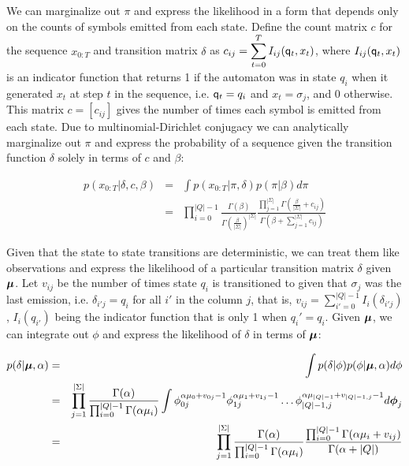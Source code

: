 We can marginalize out $\pi$ and express the likelihood in a form that depends only on the counts of symbols emitted from each state.  Define the count matrix $c$ for the sequence $x_{0:T}$ and transition matrix $\delta$ as $c_{ij} = \displaystyle\sum_{t=0}^T I_{ij}(\q_t,x_t)$, where $I_{ij}(\q_t,x_t)$ is an indicator function that returns 1 if the automaton was in state $q_i$ when it generated $x_t$ at step $t$ in the sequence, i.e. $\q_t = q_i$ and $x_t = \sigma_j$, and 0 otherwise. This matrix $c = [c_{ij}]$ gives the number of times each symbol is emitted from each state.  Due to multinomial-Dirichlet conjugacy we can analytically marginalize out $\pi$ and express the probability of a sequence given the transition function $\delta$ solely in terms of $c$ and $\beta$:

\begin{eqnarray}
 p(x_{0:T}|\delta,c,\beta) & = & \int p(x_{0:T}|\pi,\delta) p(\pi|\beta) d\pi \label{x:factor} \\
 & = & \prod_{i=0}^{|Q|-1} \frac{\Gamma(\beta)}{\Gamma(\frac{\beta}{|\Sigma|})^{|\Sigma|}} \frac{\prod_{j=1}^{|\Sigma|}\Gamma(\frac{\beta}{|\Sigma|} + c_{ij})}{\Gamma(\beta + \sum_{j=1}^{|\Sigma|} c_{ij})} \label{x:end}
 \end{eqnarray}
 
 
 
 Given that the state to state transitions are deterministic, we can treat them like observations and express the likelihood of a particular transition matrix $\delta$ given $\bmu$.  Let $v_{ij}$ be the number of times state $q_i$ is transitioned to given that $\sigma_j$ was the last emission, i.e. $\delta_{i'j} = q_i$ for all $i'$ in the column $j$, that is, $v_{ij} = \displaystyle\sum_{i' = 0}^{|Q|-1} I_{i}(\delta_{i'j})$, $I_i(q_{i'})$ being the indicator function that is only 1 when $q_i' = q_i$.  Given $\bmu$, we can integrate out $\phi$ and express the likelihood of $\delta$ in terms of $\bmu$:
 
 \begin{eqnarray}
 p(\delta|\bmu,\alpha) & = & \int p(\delta|\phi)p(\phi|\bmu,\alpha) d\phi \label{delta:factor}\\
  & = & \prod_{j=1}^{|\Sigma|} \frac{\Gamma(\alpha)}{\prod_{i=0}^{|Q|-1}\Gamma(\alpha\mu_i)} \int \phi_{0j}^{\alpha\mu_0+v_{0j}-1} \phi_{1j}^{\alpha\mu_1+v_{1j}-1} \ldots \phi_{|Q|-1,j}^{\alpha\mu_{|Q|-1}+v_{|Q|-1,j}-1} d\bphi_j \label{delta:int}\\
  & = &  \prod_{j=1}^{|\Sigma|} \frac{\Gamma(\alpha)}{\prod_{i=0}^{|Q|-1}\Gamma(\alpha\mu_i)} \frac{\prod_{i=0}^{|Q|-1} \Gamma(\alpha\mu_i + v_{ij})}{\Gamma(\alpha + |Q|)} \label{delta:end}
  \end{eqnarray}

